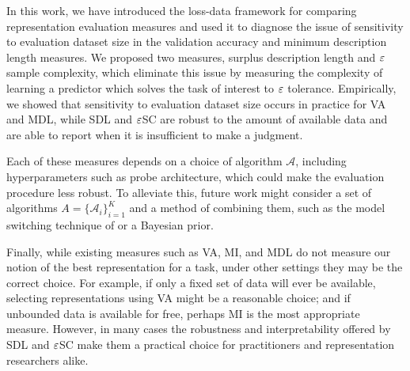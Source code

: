 In this work, we have introduced the loss-data framework for comparing representation evaluation measures and used it to diagnose the issue of sensitivity to evaluation dataset size in the validation accuracy and minimum description length measures.
We proposed two measures, surplus description length and $\varepsilon$ sample complexity, which eliminate this issue by measuring the complexity of learning a predictor which solves the task of interest to $\varepsilon$ tolerance.
Empirically, we showed that sensitivity to evaluation dataset size occurs in practice for VA and MDL, while SDL and $\varepsilon$SC are robust to the amount of available data and are able to report when it is insufficient to make a judgment.

Each of these measures depends on a choice of algorithm $\mathcal{A}$, including hyperparameters such as probe architecture, which could make the evaluation procedure less robust.
To alleviate this, future work might consider a set of algorithms $A = \{\mathcal{A}_i\}_{i=1}^K$ and a method of combining them, such as the model switching technique of \citet{Blier2018TheDL,Erven2012CatchingUF} or a Bayesian prior.

Finally, while existing measures such as VA, MI, and MDL do not measure our notion of the best representation for a task, under other settings they may be the correct choice.
For example, if only a fixed set of data will ever be available, selecting representations using VA might be a reasonable choice; and if unbounded data is available for free, perhaps MI is the most appropriate measure.
However, in many cases the robustness and interpretability offered by SDL and $\varepsilon$SC make them a practical choice for practitioners and representation researchers alike.


